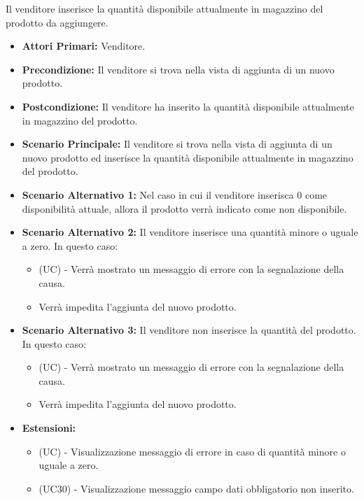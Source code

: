 Il venditore inserisce la quantità disponibile attualmente in magazzino del prodotto da aggiungere.
\begin{itemize}
    \item \textbf{Attori Primari:} Venditore.
    \item \textbf{Precondizione:} Il venditore si trova nella vista di aggiunta di un nuovo prodotto.
    \item \textbf{Postcondizione:} Il venditore ha inserito la quantità disponibile attualmente in magazzino del prodotto.
    \item \textbf{Scenario Principale:} Il venditore si trova nella vista di aggiunta di un nuovo prodotto ed inserisce la quantità disponibile attualmente in magazzino del prodotto.
    \item \textbf{Scenario Alternativo 1:} Nel caso in cui il venditore inserisca 0 come disponibilità attuale, allora il prodotto verrà indicato come non disponibile.
    \item \textbf{Scenario Alternativo 2:} Il venditore inserisce una quantità minore o uguale a zero. In questo caso:
    \begin{itemize}
        \item (UC) - Verrà mostrato un messaggio di errore con la segnalazione della causa.
        \item Verrà impedita l'aggiunta del nuovo prodotto.
    \end{itemize}
    \item \textbf{Scenario Alternativo 3:} Il venditore non inserisce la quantità del prodotto. In questo caso:
    \begin{itemize}
        \item (UC) - Verrà mostrato un messaggio di errore con la segnalazione della causa.
        \item Verrà impedita l'aggiunta del nuovo prodotto.
    \end{itemize}
    \item \textbf{Estensioni:}
        \begin{itemize}
            \item (UC) - Visualizzazione messaggio di errore in caso di quantità minore o uguale a zero.
            \item (UC30) - Visualizzazione messaggio campo dati obbligatorio non inserito.
        \end{itemize}
\end{itemize}

